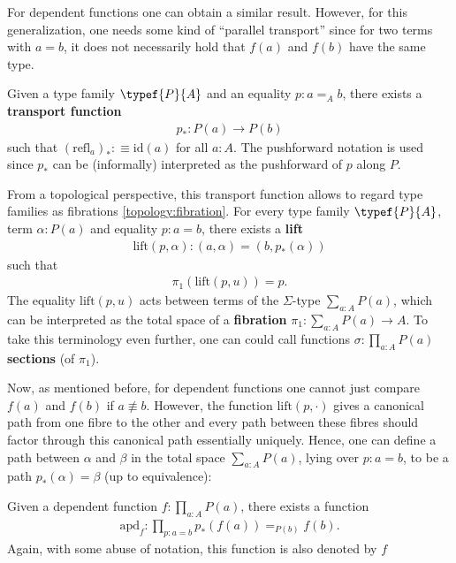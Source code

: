     For dependent functions one can obtain a similar result. However, for this generalization, one needs some kind of ``parallel transport'' since for two terms with $a=b$, it does not necessarily hold that $f(a)$ and $f(b)$ have the same type.
    \begin{property}[Transport]
        Given a type family $\typef{P}{A}$ and an equality $p:a=_Ab$, there exists a \textbf{transport function}
        \begin{gather}
            p_*:P(a)\rightarrow P(b)
        \end{gather}
        such that $(\text{refl}_a)_*:\equiv\text{id}(a)$ for all $a:A$. The pushforward notation is used since $p_*$ can be (informally) interpreted as the pushforward of $p$ along $P$.

        From a topological perspective, this transport function allows to regard type families as fibrations \ref{topology:fibration}. For every type family $\typef{P}{A}$, term $\alpha:P(a)$ and equality $p:a=b$, there exists a \textbf{lift}
        \begin{gather}
            \text{lift}(p,\alpha):(a,\alpha) = (b,p_*(\alpha))
        \end{gather}
        such that
        \begin{gather}
            \pi_1(\text{lift}(p,u))=p.
        \end{gather}
        The equality $\text{lift}(p,u)$ acts between terms of the $\Sigma$-type $\sum_{a:A}P(a)$, which can be interpreted as the total space of a \textbf{fibration} $\pi_1:\sum_{a:A}P(a)\rightarrow A$. To take this terminology even further, one can could call functions $\sigma:\prod_{a:A}P(a)$ \textbf{sections} (of $\pi_1$).
    \end{property}
    Now, as mentioned before, for dependent functions one cannot just compare $f(a)$ and $f(b)$ if $a\not\equiv b$. However, the function $\text{lift}(p,\cdot)$ gives a canonical path from one fibre to the other and every path between these fibres should factor through this canonical path essentially uniquely. Hence, one can define a path between $\alpha$ and $\beta$ in the total space $\sum_{a:A}P(a)$, lying over $p:a=b$, to be a path $p_*(\alpha)=\beta$ (up to equivalence):
    \begin{property}
        Given a dependent function $f:\prod_{a:A}P(a)$, there exists a function
        \begin{gather}
            \text{apd}_f:\prod_{p:a=b}p_*(f(a))=_{P(b)}f(b).
        \end{gather}
        Again, with some abuse of notation, this function is also denoted by $f$
    \end{property}

